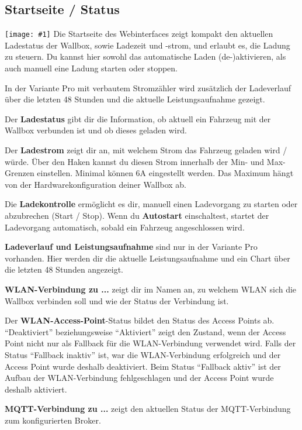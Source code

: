 \documentclass[a4paper,10pt]{article}
\newcommand{\gfx}[1]{\texttt{[image: \#1]}}
\begin{document}
\begin{multicols*}{2}
	\subsection{Startseite / Status}
	\gfx{./img_warp2/resized/web_status}
	Die Startseite des Webinterfaces zeigt kompakt den aktuellen Ladestatus der
	Wallbox, sowie Ladezeit und -strom, und erlaubt es, die Ladung zu steuern.
	Du kannst hier sowohl das automatische Laden (de-)aktivieren, als auch
	manuell eine Ladung starten oder stoppen.

	In der Variante Pro mit verbautem Stromzähler wird zusätzlich der Ladeverlauf
	über die letzten 48 Stunden und die aktuelle Leistungsaufnahme gezeigt.

	Der \textbf{Ladestatus} gibt dir die Information, ob aktuell ein
	Fahrzeug mit der Wallbox verbunden ist und ob dieses geladen wird.

	Der \textbf{Ladestrom} zeigt dir an, mit welchem Strom das Fahrzeug geladen
	wird / würde. Über den Haken kannst du diesen Strom innerhalb der Min-
	und Max-Grenzen einstellen. Minimal können 6A eingestellt werden. Das
	Maximum hängt von der Hardwarekonfiguration deiner Wallbox ab.

	Die \textbf{Ladekontrolle} ermöglicht es dir, manuell einen Ladevorgang zu
	starten oder abzubrechen (Start / Stop). Wenn du \textbf{Autostart}
	einschaltest, startet der Ladevorgang automatisch, sobald ein Fahrzeug
	angeschlossen wird.

	\textbf{Ladeverlauf und Leistungsaufnahme} sind nur in der Variante Pro
	vorhanden. Hier werden dir die aktuelle Leistungsaufnahme und ein Chart über
	die letzten 48 Stunden angezeigt.

	\textbf{WLAN-Verbindung zu ...} zeigt dir im Namen an, zu welchem WLAN
	sich die Wallbox verbinden soll und wie der Status der Verbindung ist.

	Der \textbf{WLAN-Access-Point}-Status bildet den Status des Access Points ab.
	\enquote{Deaktiviert} beziehungsweise \enquote{Aktiviert} zeigt den Zustand, wenn der Access Point nicht
	nur als Fallback für die WLAN-Verbindung verwendet wird. Falls der Status \enquote{Fallback inaktiv} ist,
	war die WLAN-Verbindung erfolgreich und der Access Point wurde deshalb deaktiviert.
	Beim Status \enquote{Fallback aktiv} ist der Aufbau der WLAN-Verbindung fehlgeschlagen und der
	Access Point wurde deshalb aktiviert.

	\textbf{MQTT-Verbindung zu ...} zeigt den aktuellen Status der MQTT-Verbindung
	zum konfigurierten Broker.


\end{multicols*}
\end{document}
